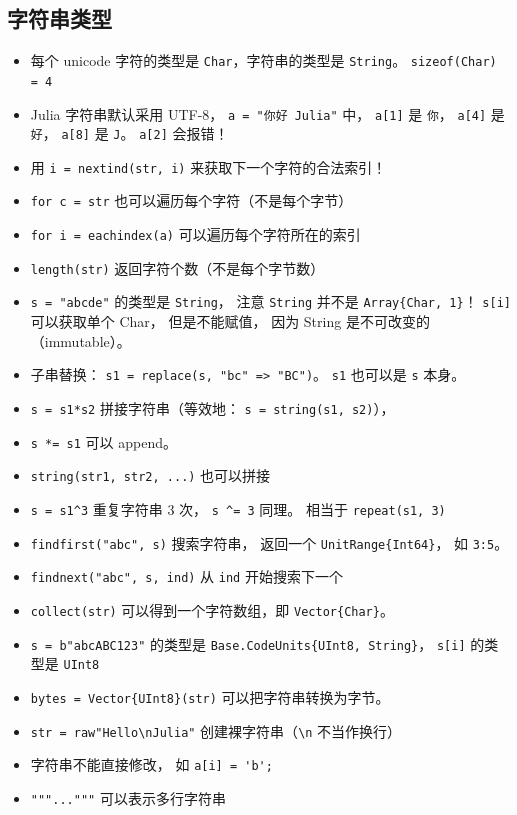 \subsection{字符串类型}
\begin{itemize}
\item 每个 unicode 字符的类型是 \verb`Char`，字符串的类型是 \verb`String`。
\verb`sizeof(Char) = 4`
\item Julia 字符串默认采用 UTF-8， \verb`a = "你好 Julia"` 中， \verb`a[1]` 是 \verb`你`， \verb`a[4]` 是 \verb`好`， \verb`a[8]` 是 \verb`J`。 \verb`a[2]` 会报错！
\item 用 \verb`i = nextind(str, i)` 来获取下一个字符的合法索引！
\item \verb`for c = str` 也可以遍历每个字符（不是每个字节）
\item \verb`for i = eachindex(a)` 可以遍历每个字符所在的索引
\item \verb`length(str)` 返回字符个数（不是每个字节数）
\item \verb`s = "abcde"` 的类型是 \verb`String`， 注意 \verb`String` 并不是 \verb`Array{Char, 1}`！ \verb`s[i]` 可以获取单个 Char， 但是不能赋值， 因为 String 是不可改变的（immutable）。
\item 子串替换： \verb`s1 = replace(s, "bc" => "BC")`。 \verb`s1` 也可以是 \verb`s` 本身。
\item \verb`s = s1*s2` 拼接字符串（等效地： \verb`s = string(s1, s2)`）， \item \verb`s *= s1` 可以 append。
\item \verb`string(str1, str2, ...)` 也可以拼接
\item \verb`s = s1^3` 重复字符串 3 次， \verb`s ^= 3` 同理。 相当于 \verb`repeat(s1, 3)`
\item \verb`findfirst("abc", s)` 搜索字符串， 返回一个 \verb`UnitRange{Int64}`， 如 \verb`3:5`。
\item \verb`findnext("abc", s, ind)` 从 \verb`ind` 开始搜索下一个
\item \verb`collect(str)` 可以得到一个字符数组，即 \verb`Vector{Char}`。
\item \verb`s = b"abcABC123"` 的类型是 \verb`Base.CodeUnits{UInt8, String}`， \verb`s[i]` 的类型是 \verb`UInt8`
\item \verb`bytes = Vector{UInt8}(str)` 可以把字符串转换为字节。
\item \verb`str = raw"Hello\nJulia"` 创建裸字符串（\verb`\n` 不当作换行）
\item 字符串不能直接修改， 如 \verb`a[i] = 'b';`
\item \verb`"""..."""` 可以表示多行字符串

\end{itemize}
